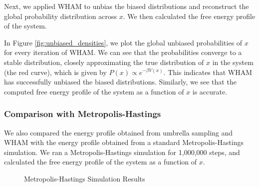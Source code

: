 \documentclass{article}
\begin{document}
Next, we applied WHAM to unbias the biased distributions and reconstruct the global probability distribution across $x$. We then calculated the free energy profile of the system.

In Figure \ref{fig:unbiased_densities}, we plot the global unbiased probabilities of $x$ for every iteration of WHAM. We can see that the probabilities converge to a stable distribution, closely approximating the true distribution of $x$ in the system (the red curve), which is given by $P(x) \propto e^{-\beta V(x)}$. This indicates that WHAM has successfully unbiased the biased distributions. Similarly, we see that the computed free energy profile of the system as a function of $x$ is accurate.

\subsubsection{Comparison with Metropolis-Hastings}

We also compared the energy profile obtained from umbrella sampling and WHAM with the energy profile obtained from a standard Metropolis-Hastings simulation. We ran a Metropolis-Hastings simulation for 1,000,000 steps, and calculated the free energy profile of the system as a function of $x$.

\begin{figure}[h]%
    \centering
    \qquad
    \caption{Metropolis-Hastings Simulation Results}%
    \label{fig:metro_hastings_plot}%
\end{figure}
\end{document}

